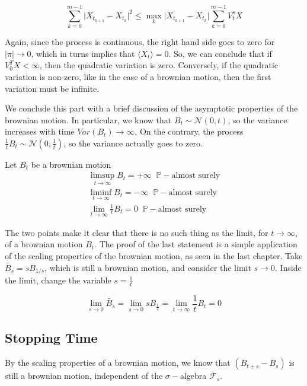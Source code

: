 \begin{equation*}
    \sum_{k=0}^{m-1} \vert X_{t_{k+1}}-X_{t_k} \vert^2 \leq \max_{k} \vert X_{t_{k+1}}-X_{t_k} \vert \sum_{k=0}^{m-1} V_t^s X
\end{equation*}

Again, since the process is continuous, the right hand side goes to zero for $\vert \pi \vert \to 0$, which in turns implies that $\langle X_t \rangle = 0$. So, we can conclude that if $V_0^T X < \infty$, then the quadratic variation is zero. Conversely, if the quadratic variation is non-zero, like in the case of a brownian motion, then the first variation must be infinite. 

We conclude this part with a brief discussion of the asymptotic properties of the brownian motion. In particular, we know that $B_t \sim \mathcal{N}(0,t)$, so the variance increases with time $Var(B_t) \to \infty$. On the contrary, the process $\frac{1}{t}B_t \sim \mathcal{N}(0,\frac{1}{t})$, so the variance actually goes to zero.

\begin{proposition}
    Let $B_t$ be a brownian motion
    \begin{gather*}
        \limsup_{t \to \infty} B_t = +\infty \;\; \mathbb{P}-\text{almost surely} \\
        \liminf_{t \to \infty} B_t = -\infty \;\; \mathbb{P}-\text{almost surely} \\
        \lim_{t \to \infty} \frac{1}{t} B_t = 0 \;\; \mathbb{P}-\text{almost surely}
        \end{gather*}
\end{proposition}

The two points make it clear that there is no such thing as the limit, for $t \to \infty$, of a brownian motion $B_t$. The proof of the last statement is a simple application of the scaling properties of the brownian motion, as seen in the last chapter. Take $\tilde{B_s} = s B_{1/s}$, which is still a brownian motion, and consider the limit $s \to 0$. Inside the limit, change the variable $s = \frac{1}{t}$

\begin{equation*}
    \lim_{s \to 0} \tilde{B_s} = \lim_{s \to 0} s B_{\frac{1}{s}} = \lim_{t \to \infty} \frac{1}{t} B_t = 0
\end{equation*}

\subsection{Stopping Time}
By the scaling properties of a brownian motion, we know that $(B_{t+s}-B_s)$ is still a brownian motion, independent of the $\sigma-$algebra $\mathcal{F}_s$. 

